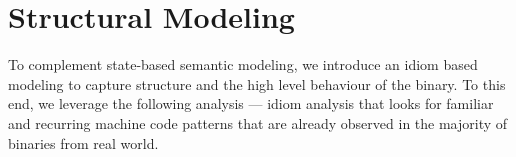 
\section{Structural Modeling} \label{subsec:abs_sem_mod}


To complement state-based semantic modeling, we introduce an idiom based modeling to capture structure and the high level behaviour of the binary.
To this end, we leverage the following analysis ---  idiom analysis that looks for familiar and recurring machine code patterns that are already observed in the majority of binaries from real world. 


